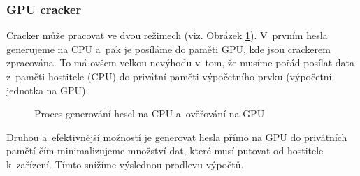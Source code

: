 \subsubsection{GPU cracker}
Cracker může pracovat ve dvou režimech (viz. Obrázek \ref{CPUGPU}). V~prvním hesla generujeme na
CPU a~pak je posíláme do paměti GPU, kde jsou crackerem zpracována. To má ovšem velkou nevýhodu
v~tom, že musíme pořád posílat data z~paměti hostitele (CPU) do privátní paměti výpočetního prvku
(výpočetní jednotka na GPU).
\begin{figure}[ht]
    \begin{center}
    \end{center}
    \caption{Proces generování hesel na CPU a~ověřování na GPU \cite{Schmied}}
    \label{CPUGPU}
\end{figure}

 Druhou a~efektivnější možností je generovat hesla přímo na GPU do privátních pamětí čím
minimalizujeme množství dat, které musí putovat od hostitele k~zařízení. Tímto snížíme výslednou
prodlevu výpočtů.

